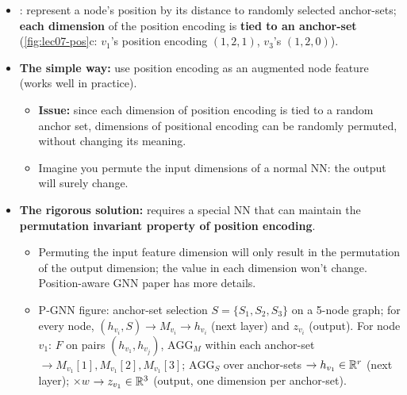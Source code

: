 \begin{itemize}
  \item {}: represent a node's position by its
    distance to randomly selected anchor-sets; \textbf{each dimension} of the
    position encoding is \textbf{tied to an anchor-set} (\cref{fig:lec07-pos}c:
    $v_1$'s position encoding $(1,2,1)$, $v_3$'s $(1,2,0)$).
  \item \textbf{The simple way:} use position encoding as an augmented node feature
    (works well in practice).
    \begin{itemize}
      \item \textbf{Issue:} since each dimension of position encoding is tied to a
        random anchor set, dimensions of positional encoding can be randomly
        permuted, without changing its meaning.
      \item Imagine you permute the input dimensions of a normal NN: the output
        will surely change.
    \end{itemize}
  \item \textbf{The rigorous solution:} requires a special NN that can maintain the
    \textbf{permutation invariant property of position encoding}.
    \begin{itemize}
      \item Permuting the input feature dimension will only result in the
        permutation of the output dimension; the value in each dimension won't
        change. Position-aware GNN paper has more details.
      \item P-GNN figure: anchor-set selection $S=\{S_1,S_2,S_3\}$ on a 5-node
        graph; for every node, $(h_{v_i},S)\to M_{v_i}\to h_{v_i}$ (next layer) and
        $z_{v_i}$ (output). For node $v_1$: $F$ on pairs $(h_{v_1},h_{v_j})$,
        $\mathrm{AGG}_M$ within each anchor-set $\to M_{v_1}[1],M_{v_1}[2],M_{v_1}[3]$;
        $\mathrm{AGG}_S$ over anchor-sets $\to h_{v_1}\in\mathbb{R}^r$ (next layer);
        $\times w$ $\to z_{v_1}\in\mathbb{R}^3$ (output, one dimension per anchor-set).
    \end{itemize}
\end{itemize}

